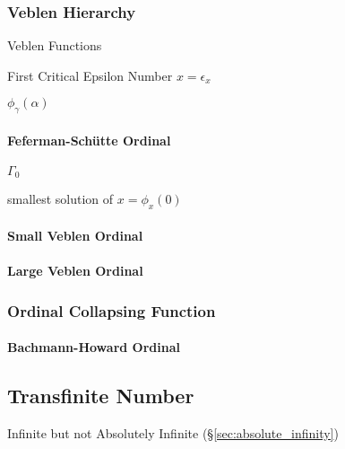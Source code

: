 \subsubsection{Veblen Hierarchy}\label{sec:veblen_hierarchy}

Veblen Functions %

First Critical Epsilon Number $x = \epsilon_x$ %

$\phi_\gamma(\alpha)$



\paragraph{Feferman-Sch\"utte Ordinal}\label{sec:feferman_schutte}\hfill

$\Gamma_0$

smallest solution of $x = \phi_x(0)$



\paragraph{Small Veblen Ordinal}\label{sec:small_veblen}\hfill

\paragraph{Large Veblen Ordinal}\label{sec:large_veblen}\hfill



\subsubsection{Ordinal Collapsing Function}
\label{sec:ordinal_collapsing}

\paragraph{Bachmann-Howard Ordinal}\label{sec:bachmann_howard}



\subsection{Transfinite Number}\label{sec:transfinite_number}

Infinite but not Absolutely Infinite (\S\ref{sec:absolute_infinity})



